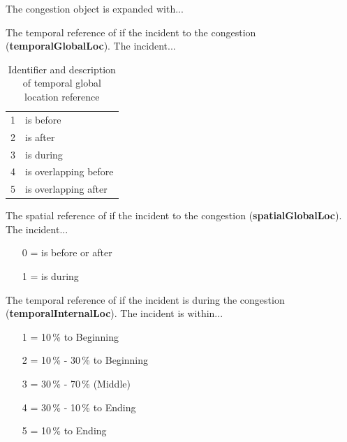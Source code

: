 \documentclass[a4paper,headsepline,footsepline,fontsize=11pt,BCOR=12mm,DIV=12]{report}
\begin{document}

The congestion object is expanded with...

The temporal reference of if the incident to the congestion (\textbf{temporalGlobalLoc}). The incident...
\noindent
\begin{table}[h!]
	\centering
	\begin{tabular}{c|l}  
		1 & is before \\ 
 		2 & is after \\ 
 		3 & is during \\
 		4 & is overlapping before \\
 		5 & is overlapping after \\
	\end{tabular}
	\caption{Identifier and description of temporal global location reference}
\end{table}

The spatial reference of if the incident to the congestion (\textbf{spatialGlobalLoc}). The incident...
\begin{itemize}
	\setlength\itemsep{0em}
	\item[0] = is before or after
	\item[1] = is during
\end{itemize}

The temporal reference of if the incident is during the congestion (\textbf{temporalInternalLoc}). The incident is within...
\begin{itemize}
	\setlength\itemsep{0em}
	\item[1] = 10\,\% to Beginning
	\item[2] = 10\,\% - 30\,\% to Beginning
	\item[3] = 30\,\% - 70\,\% (Middle)
	\item[4] = 30\,\% - 10\,\% to Ending
	\item[5] = 10\,\% to Ending
\end{itemize}
\end{document}
